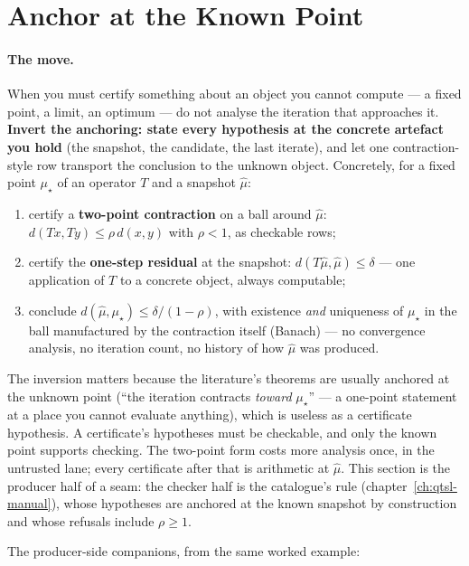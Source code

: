 \section{Anchor at the Known Point}
\label{sec:ckbk-anchor}

\paragraph{The move.} When you must certify something about an object
you cannot compute --- a fixed point, a limit, an optimum --- do not
analyse the iteration that approaches it. \textbf{Invert the
anchoring: state every hypothesis at the concrete artefact you hold}
(the snapshot, the candidate, the last iterate), and let one
contraction-style row transport the conclusion to the unknown object.
Concretely, for a fixed point $\mu_\star$ of an operator $T$ and a
snapshot $\hat\mu$:

\begin{enumerate}
\item certify a \textbf{two-point contraction} on a ball around
  $\hat\mu$: $d(Tx, Ty) \le \rho\, d(x, y)$ with $\rho < 1$, as
  checkable rows;
\item certify the \textbf{one-step residual} at the snapshot:
  $d(T\hat\mu, \hat\mu) \le \delta$ --- one application of $T$ to a
  concrete object, always computable;
\item conclude $d(\hat\mu, \mu_\star) \le \delta/(1-\rho)$, with
  existence \emph{and} uniqueness of $\mu_\star$ in the ball
  manufactured by the contraction itself (Banach) --- no convergence
  analysis, no iteration count, no history of how $\hat\mu$ was
  produced.
\end{enumerate}

The inversion matters because the literature's theorems are usually
anchored at the unknown point (``the iteration contracts \emph{toward}
$\mu_\star$'' --- a one-point statement at a place you cannot evaluate
anything), which is useless as a certificate hypothesis. A
certificate's hypotheses must be checkable, and only the known point
supports checking. The two-point form costs more analysis once, in the
untrusted lane; every certificate after that is arithmetic at
$\hat\mu$. This section is the producer half of a seam: the checker
half is the catalogue's  rule
(chapter~\ref{ch:qtsl-manual}), whose hypotheses are anchored at the
known snapshot by construction and whose refusals include
$\rho \ge 1$.

The producer-side companions, from the same worked example:

